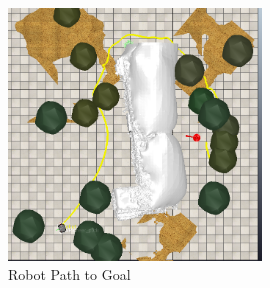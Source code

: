 \begin{figure}[H]
  \centering
  \includegraphics[width= 0.6\textwidth]{Figures/Tw-03.PNG}
  \caption[Robot Path to Goal]{Robot Path to Goal}
   \label{fig:Robot Path to Goal} 
\end{figure}

